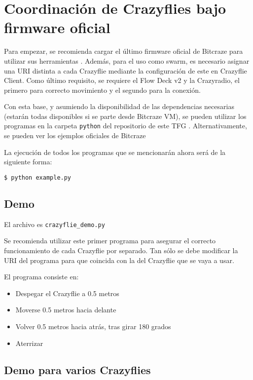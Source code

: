 \section{Coordinación de Crazyflies bajo firmware oficial}

Para empezar, se recomienda cargar el último firmware oficial de Bitcraze para utilizar sus herramientas \cite{crazyflie_firmware_upgrade}. 
Además, para el uso como swarm, es necesario asignar una URI distinta a cada Crazyflie mediante la configuración de este en Crazyflie Client. 
Como último requisito, se requiere el Flow Deck v2 y la Crazyradio, 
el primero para correcto movimiento y el segundo para la conexión.

Con esta base, y asumiendo la disponibilidad de las dependencias necesarias 
(estarán todas disponibles si se parte desde Bitcraze VM), 
se pueden utilizar los programas en la carpeta \texttt{python} del repositorio de este TFG \cite{bt-crazyflies}.
Alternativamente, se pueden ver los ejemplos oficiales de Bitcraze \cite{cflib-examples}

La ejecución de todos los programas que se mencionarán ahora será de la siguiente forma:

\begin{lstlisting}[style=CodigoBash]
$ python example.py
\end{lstlisting}

\subsection{Demo}

El archivo es \texttt{crazyflie\_demo.py}

Se recomienda utilizar este primer programa para asegurar el correcto funcionamiento de cada Crazyflie por separado. 
Tan sólo se debe modificar la URI del programa para que coincida con la del Crazyflie que se vaya a usar.

El programa consiste en:

\begin{itemize}
    \item Despegar el Crazyflie a 0.5 metros
    \item Moverse 0.5 metros hacia delante
    \item Volver 0.5 metros hacia atrás, tras girar 180 grados
    \item Aterrizar
\end{itemize}

\subsection{Demo para varios Crazyflies}

